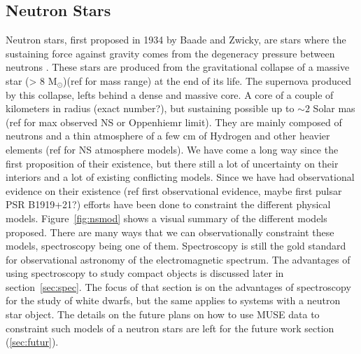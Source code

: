 
\subsection{Neutron Stars}\label{sec:ns}

Neutron stars, first proposed in 1934 by Baade and Zwicky,  are stars where the sustaining force against gravity comes from  the degeneracy pressure between neutrons \citep{baade_cosmic_1934}. These stars are produced from the gravitational collapse of a massive star (> 8 M$_\odot$)(ref for mass range) at the end of its life. The supernova produced by this collapse, lefts behind a dense and massive core. A core of a couple of kilometers in radius (exact number?), but sustaining possible up to $\sim 2$ Solar mas (ref for max observed NS or Oppenhiemr limit). They are mainly  composed of neutrons and a thin atmosphere of a few cm of Hydrogen and other heavier elements (ref for NS atmosphere models). We have come a long way since the first proposition of their existence, but there still a lot of  uncertainty on their interiors and a lot of existing conflicting models. Since we have had observational evidence on their existence (ref first observational evidence, maybe first pulsar PSR B1919+21?) efforts have been done to constraint the different physical models. Figure~\ref{fig:nsmod} shows a visual summary of the different models proposed. There are many ways that we can observationally constraint these models, spectroscopy being one of them. Spectroscopy is still the gold standard for observational astronomy of the electromagnetic spectrum. The advantages of using spectroscopy to study compact objects is discussed later in section~\ref{sec:spec}. The focus of that section is on the advantages of spectroscopy for the study of white dwarfs, but the same applies to systems with a neutron star object. The details on the future plans on how to use MUSE data to constraint such models of a neutron stars are left for the future work section (\ref{sec:futur}).\\




